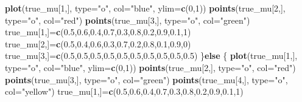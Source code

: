 \documentclass[]{article}
\newenvironment{Shaded}{\begin{snugshade}}{\end{snugshade}}
\newcommand{\KeywordTok}[1]{\textcolor[rgb]{0.13,0.29,0.53}{\textbf{#1}}}
\newcommand{\DataTypeTok}[1]{\textcolor[rgb]{0.13,0.29,0.53}{#1}}
\newcommand{\DecValTok}[1]{\textcolor[rgb]{0.00,0.00,0.81}{#1}}
\newcommand{\FloatTok}[1]{\textcolor[rgb]{0.00,0.00,0.81}{#1}}
\newcommand{\StringTok}[1]{\textcolor[rgb]{0.31,0.60,0.02}{#1}}
\newcommand{\ControlFlowTok}[1]{\textcolor[rgb]{0.13,0.29,0.53}{\textbf{#1}}}
\newcommand{\NormalTok}[1]{#1}
\begin{document}
\begin{Shaded}
\begin{Highlighting}[]
\KeywordTok{plot}\NormalTok{(true_mu[}\DecValTok{1}\NormalTok{,], }\DataTypeTok{type=}\StringTok{"o"}\NormalTok{, }\DataTypeTok{col=}\StringTok{"blue"}\NormalTok{, }\DataTypeTok{ylim=}\KeywordTok{c}\NormalTok{(}\DecValTok{0}\NormalTok{,}\DecValTok{1}\NormalTok{))}
\KeywordTok{points}\NormalTok{(true_mu[}\DecValTok{2}\NormalTok{,], }\DataTypeTok{type=}\StringTok{"o"}\NormalTok{, }\DataTypeTok{col=}\StringTok{"red"}\NormalTok{)}
\KeywordTok{points}\NormalTok{(true_mu[}\DecValTok{3}\NormalTok{,], }\DataTypeTok{type=}\StringTok{"o"}\NormalTok{, }\DataTypeTok{col=}\StringTok{"green"}\NormalTok{)}
\NormalTok{true_mu[}\DecValTok{1}\NormalTok{,]=}\KeywordTok{c}\NormalTok{(}\FloatTok{0.5}\NormalTok{,}\FloatTok{0.6}\NormalTok{,}\FloatTok{0.4}\NormalTok{,}\FloatTok{0.7}\NormalTok{,}\FloatTok{0.3}\NormalTok{,}\FloatTok{0.8}\NormalTok{,}\FloatTok{0.2}\NormalTok{,}\FloatTok{0.9}\NormalTok{,}\FloatTok{0.1}\NormalTok{,}\DecValTok{1}\NormalTok{)}
\NormalTok{true_mu[}\DecValTok{2}\NormalTok{,]=}\KeywordTok{c}\NormalTok{(}\FloatTok{0.5}\NormalTok{,}\FloatTok{0.4}\NormalTok{,}\FloatTok{0.6}\NormalTok{,}\FloatTok{0.3}\NormalTok{,}\FloatTok{0.7}\NormalTok{,}\FloatTok{0.2}\NormalTok{,}\FloatTok{0.8}\NormalTok{,}\FloatTok{0.1}\NormalTok{,}\FloatTok{0.9}\NormalTok{,}\DecValTok{0}\NormalTok{)}
\NormalTok{true_mu[}\DecValTok{3}\NormalTok{,]=}\KeywordTok{c}\NormalTok{(}\FloatTok{0.5}\NormalTok{,}\FloatTok{0.5}\NormalTok{,}\FloatTok{0.5}\NormalTok{,}\FloatTok{0.5}\NormalTok{,}\FloatTok{0.5}\NormalTok{,}\FloatTok{0.5}\NormalTok{,}\FloatTok{0.5}\NormalTok{,}\FloatTok{0.5}\NormalTok{,}\FloatTok{0.5}\NormalTok{,}\FloatTok{0.5}\NormalTok{)}
\NormalTok{\}}\ControlFlowTok{else}\NormalTok{ \{}
\KeywordTok{plot}\NormalTok{(true_mu[}\DecValTok{1}\NormalTok{,], }\DataTypeTok{type=}\StringTok{"o"}\NormalTok{, }\DataTypeTok{col=}\StringTok{"blue"}\NormalTok{, }\DataTypeTok{ylim=}\KeywordTok{c}\NormalTok{(}\DecValTok{0}\NormalTok{,}\DecValTok{1}\NormalTok{))}
\KeywordTok{points}\NormalTok{(true_mu[}\DecValTok{2}\NormalTok{,], }\DataTypeTok{type=}\StringTok{"o"}\NormalTok{, }\DataTypeTok{col=}\StringTok{"red"}\NormalTok{)}
\KeywordTok{points}\NormalTok{(true_mu[}\DecValTok{3}\NormalTok{,], }\DataTypeTok{type=}\StringTok{"o"}\NormalTok{, }\DataTypeTok{col=}\StringTok{"green"}\NormalTok{)}
\KeywordTok{points}\NormalTok{(true_mu[}\DecValTok{4}\NormalTok{,], }\DataTypeTok{type=}\StringTok{"o"}\NormalTok{, }\DataTypeTok{col=}\StringTok{"yellow"}\NormalTok{)}
\NormalTok{true_mu[}\DecValTok{1}\NormalTok{,]=}\KeywordTok{c}\NormalTok{(}\FloatTok{0.5}\NormalTok{,}\FloatTok{0.6}\NormalTok{,}\FloatTok{0.4}\NormalTok{,}\FloatTok{0.7}\NormalTok{,}\FloatTok{0.3}\NormalTok{,}\FloatTok{0.8}\NormalTok{,}\FloatTok{0.2}\NormalTok{,}\FloatTok{0.9}\NormalTok{,}\FloatTok{0.1}\NormalTok{,}\DecValTok{1}\NormalTok{)}

\end{Highlighting}
\end{Shaded}
\end{document}
